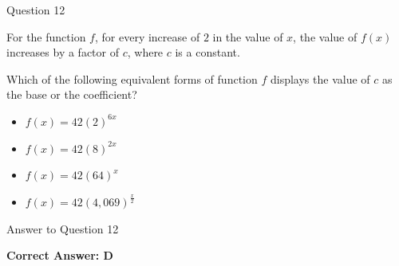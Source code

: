 \documentclass{beamer}
\begin{document}
\begin{frame}{Question 12}

For the function $f$, for every increase of $2$ in the value of $x$, the value of $f(x)$ increases by a factor of $c$, where $c$ is a constant.

Which of the following equivalent forms of function $f$ displays the value of $c$ as the base or the coefficient?

\begin{itemize}
    \item[A.] $f(x)=42(2)^{6x}$
    \item[B.] $f(x)=42(8)^{2x}$
    \item[C.] $f(x)=42(64)^x$
    \item[D.] $f(x)=42(4,069)^{\frac{x}{2}}$
\end{itemize}

\end{frame}

\begin{frame}{Answer to Question 12}

\textbf{Correct Answer: D}

\end{frame}
\end{document}
